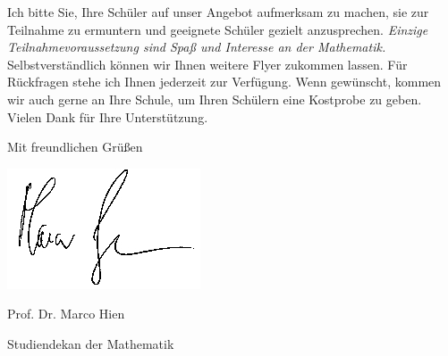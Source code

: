 \documentclass{zirkelbrief}
\begin{document}
Ich bitte Sie, Ihre Schüler auf unser Angebot aufmerksam zu machen, sie zur
Teilnahme zu ermuntern und geeignete Schüler gezielt
anzusprechen. \emph{Einzige Teilnahmevoraussetzung sind Spaß und
Interesse an der Mathematik.} Selbstverständlich können wir Ihnen weitere Flyer
zukommen lassen. Für Rückfragen stehe ich Ihnen jederzeit zur Verfügung. Wenn gewünscht, kommen wir auch
gerne an Ihre Schule, um Ihren Schülern eine Kostprobe zu geben. Vielen Dank für Ihre
Unterstützung.

Mit freundlichen Grüßen
\vspace{0.1cm}

\hspace{1cm} \includegraphics[scale=0.3]{unterschrift_marco_hien}

\vspace{-0.2cm}

Prof. Dr. Marco Hien

\vspace{-0.2cm}

{\small Studiendekan der Mathematik}
\end{document}
